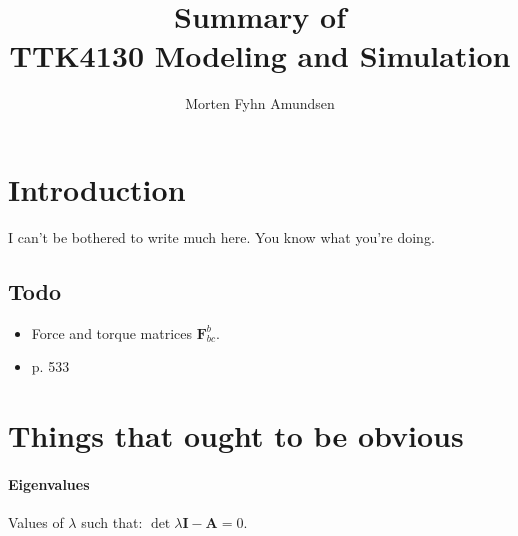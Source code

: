 \documentclass[a4paper, 12pt]{article}
\title{Summary of \\ TTK4130 Modeling and Simulation}
\author{Morten Fyhn Amundsen}
\affil{NTNU}
\newcommand{\comment}[1]{\textcolor{RedOrange}{#1}}
\begin{document}
\maketitle
\tableofcontents
\newpage

\newcommand{\enforall}{\enskip \forall \enskip}
\newcommand{\residual}{\operatornamewithlimits{Res}}
\newcommand{\V}[1]{\mathbf{#1}}							%
\newcommand{\M}[1]{\bm{#1}}								%
\newcommand{\I}{\mathbf{I}}								%
\newcommand{\y}{\V{y}}									%
\newcommand{\ydot}{\V{\dot{y}}}							%
\newcommand{\R}{\M{R}}									%
\newcommand{\T}{^{\text{T}}}							%
\newcommand{\half}{\nicefrac{1}{2}}						%
\newcommand{\nf}[2]{\nicefrac{#1}{#2}}					%
\newcommand{\angvel}{\boldsymbol{\omega}}
\newcommand{\gv}[1]{\boldsymbol{#1}}
\newcommand{\lagr}{\mathcal{L}}
\newcommand{\presuper}[1]{\fourIdx{#1}{}{}{}}

\renewcommand{\c}{\operatorname{c}}						%
\newcommand{\s}{\operatorname{s}}						%
\renewcommand{\b}[1]{\textbf{#1}}

\section{Introduction}
I can't be bothered to write much here. You know what you're doing.

\subsection{Todo}
\begin{itemize}
	\item Force and torque matrices \( \M{F}^b_{bc} \).
	\item \comment{p. 533}
\end{itemize}

\section{Things that ought to be obvious}
\paragraph{Eigenvalues} Values of \( \lambda \) such that: \( \det{\lambda \I - \M{A}} = 0 \).
\end{document}
